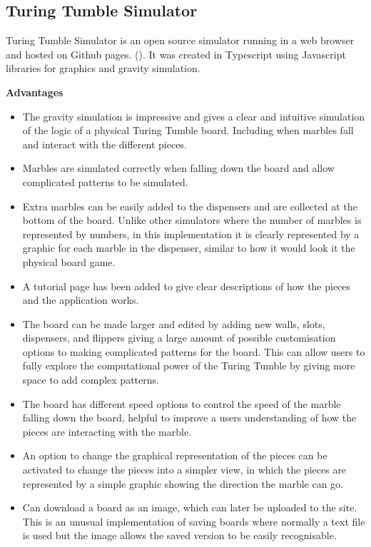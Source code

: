 \documentclass{l4proj}
\begin{document}
\subsection{Turing Tumble Simulator}
Turing Tumble Simulator is an open source simulator running in a web browser and hosted on Github pages. (\cite{turing_tumble_simulator}). It was created in Typescript using Javascript libraries for graphics and gravity simulation. 

\textbf{Advantages}
\begin{itemize}
    \item The gravity simulation is impressive and gives a clear and intuitive simulation of the logic of a physical Turing Tumble board. Including when marbles fall and interact with the different pieces.
    \item Marbles are simulated correctly when falling down the board and allow complicated patterns to be simulated.
    \item Extra marbles can be easily added to the dispensers and are collected at the bottom of the board. Unlike other simulators where the number of marbles is represented by numbers, in this implementation it is clearly represented by a graphic for each marble in the dispenser, similar to how it would look it the physical board game.
    \item A tutorial page has been added to give clear descriptions of how the pieces and the application works.
    \item The board can be made larger and edited by adding new walls, slots, dispensers, and flippers giving a large amount of possible customisation options to making complicated patterns for the board. This can allow users to fully explore the computational power of the Turing Tumble by giving more space to add complex patterns.
    \item The board has different speed options to control the speed of the marble falling down the board, helpful to improve a users understanding of how the pieces are interacting with the marble.
    \item An option to change the graphical representation of the pieces can be activated to change the pieces into a simpler view, in which the pieces are represented by a simple graphic showing the direction the marble can go.
    \item Can download a board as an image, which can later be uploaded to the site. This is an unusual implementation of saving boards where normally a text file is used but the image allows the saved version to be easily recognisable.
\end{itemize}
\end{document}
